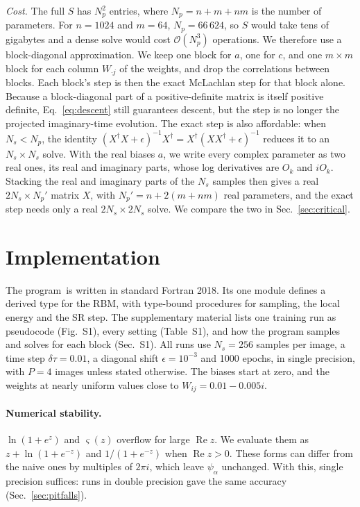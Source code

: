 \documentclass[aps,prb,preprint,amsmath,amssymb,nofootinbib,longbibliography]{revtex4-2}
\newcommand{\dtau}{\delta\tau}
\renewcommand{\Re}{\operatorname{Re}}
\begin{document}
\emph{Cost.} The full $S$ has $N_p^2$ entries, where $N_p = n + m + nm$ is the number of parameters. For $n = 1024$
and $m = 64$, $N_p = 66\,624$, so $S$ would take tens of gigabytes and a dense solve would cost
$\mathcal{O}(N_p^3)$ operations. We therefore use a block-diagonal approximation. We keep one block for $a$, one for
$c$, and one $m\times m$ block for each column $W_{\cdot j}$ of the weights, and drop the correlations between
blocks. Each block's step is then the exact McLachlan step for that block alone. Because a block-diagonal part of a
positive-definite matrix is itself positive definite, Eq.~\eqref{eq:descent} still guarantees descent, but the step
is no longer the projected imaginary-time evolution. The exact step is also affordable: when $N_s < N_p$, the
identity $(X^\dagger X + \epsilon)^{-1}X^\dagger = X^\dagger(XX^\dagger + \epsilon)^{-1}$ reduces it to an
$N_s\times N_s$ solve.\cite{chen2024,rende2024} With the real biases $a$, we write every complex parameter as two
real ones, its real and imaginary parts, whose log derivatives are $O_k$ and $iO_k$. Stacking the real and imaginary
parts of the $N_s$ samples then gives a real $2N_s\times N_p'$ matrix $X$, with $N_p' = n + 2(m + nm)$ real
parameters, and the exact step needs only a real $2N_s\times 2N_s$ solve. We compare the two in
Sec.~\ref{sec:critical}.

\section{Implementation}
\label{sec:implementation}

The program\codecite\ is written in standard Fortran 2018. Its one module defines a derived type for the RBM,
with type-bound procedures for sampling, the local energy and the SR step. The supplementary material lists one
training run as pseudocode (Fig.~S1), every setting (Table~S1), and how the program samples and solves for each
block (Sec.~S1). All runs use $N_s = 256$ samples per image, a time
step $\dtau = 0.01$, a diagonal shift $\epsilon = 10^{-3}$ and 1000 epochs, in single precision, with $P = 4$ images unless stated
otherwise. The biases start at zero, and the weights at nearly uniform values close
to $W_{ij} = 0.01 - 0.005i$.

\paragraph*{Numerical stability.}
$\ln(1 + e^z)$ and $\varsigma(z)$ overflow for large $\Re z$. We evaluate them as $z + \ln(1 + e^{-z})$ and
$1/(1 + e^{-z})$ when $\Re z > 0$. These forms can differ from the naive ones by multiples of $2\pi i$, which leave
$\psi_\alpha$ unchanged. With this, single precision suffices: runs in double precision gave the same accuracy
(Sec.~\ref{sec:pitfalls}).
\end{document}
